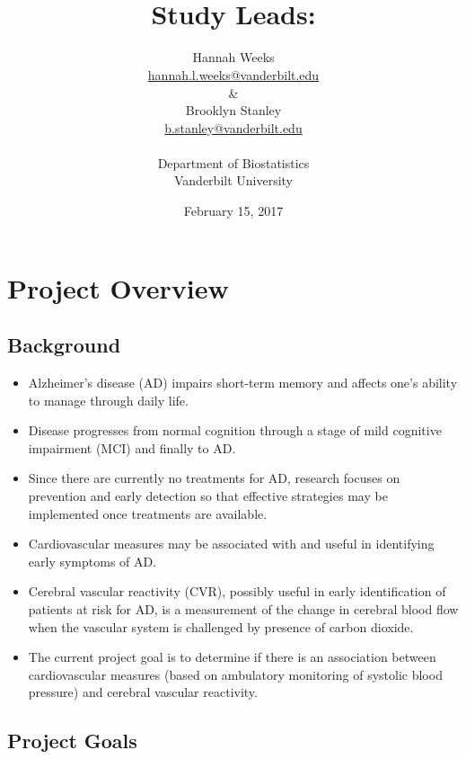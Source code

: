 \documentclass[10pt]{article}\usepackage[]{graphicx}\usepackage[]{color}
\title{\projtitl\\ Study Leads: \studyLead}
\author{Hannah Weeks \\ \href{mailto:hannah.l.weeks@vanderbilt.edu}{\url{hannah.l.weeks@vanderbilt.edu}}\\ \& \\
Brooklyn Stanley  \\ \href{mailto:b.stanley@vanderbilt.edu}{\url{b.stanley@vanderbilt.edu}}
\\ \ \\ Department of Biostatistics \\ Vanderbilt University }
\date{February 15, 2017}
\newcommand{\projtitl}{MAP: ABP and CBF/CVR}
\begin{document}
\maketitle
\clearpage
\tableofcontents     
\clearpage












\clearpage
\section{Project Overview}

\subsection{Background}

\begin{itemize}
  \item Alzheimer's disease (AD) impairs short-term memory and affects one's ability to manage through daily life. 
  \item Disease progresses from normal cognition through a stage of mild cognitive impairment (MCI) and finally to AD. 
  \item Since there are currently no treatments for AD, research focuses on prevention and early detection so that effective strategies may be implemented once treatments are available.
  \item Cardiovascular measures may be associated with and useful in identifying early symptoms of AD.
  \item Cerebral vascular reactivity (CVR), possibly useful in early identification of patients at risk for AD, is a measurement of the change in cerebral blood flow when the vascular system is challenged by presence of carbon dioxide.
  \item The current project goal is to determine if there is an association between cardiovascular measures (based on ambulatory monitoring of systolic blood pressure) and cerebral vascular reactivity.
\end{itemize}

\subsection{Project Goals}
\end{document}
